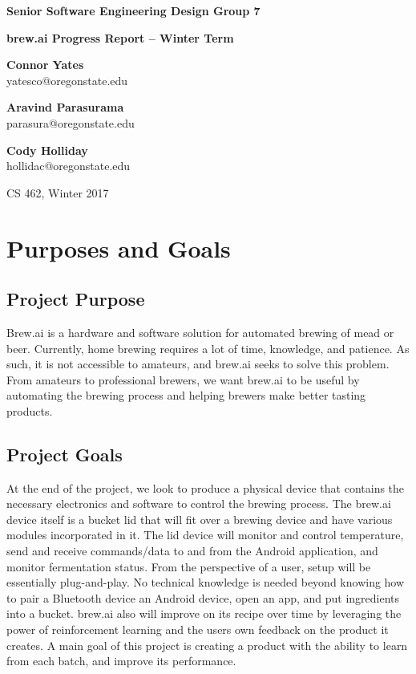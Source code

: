\documentclass[draftclsnofoot,onecolumn,letterpaper,10pt]{IEEEtran}
\begin{document}
\begin{center}
	{\huge\textbf{Senior Software Engineering Design Group 7}}
	\vspace{1cm}

	{\Huge\textbf{brew.ai Progress Report -- Winter Term}}

	\vspace{2cm}
	\textbf{Connor Yates}\\yatesco@oregonstate.edu

	\textbf{Aravind Parasurama}\\parasura@oregonstate.edu

	\textbf{Cody Holliday}\\hollidac@oregonstate.edu

	\vspace{2cm}
	{\Large CS 462, Winter 2017}
	\vspace{1cm}
\end{center}

\begin{abstract}

\end{abstract}

\newpage
\tableofcontents
\newpage

\section{Purposes and Goals}
\subsection{Project Purpose}
Brew.ai is a hardware and software solution for automated brewing of mead or beer.
Currently, home brewing requires a lot of time, knowledge, and patience.
As such, it is not accessible to amateurs, and brew.ai seeks to solve this problem.
From amateurs to professional brewers, we want brew.ai to be useful by automating the brewing process and helping brewers make better tasting products.

\subsection{Project Goals}
At the end of the project, we look to produce a physical device that contains the necessary electronics and software to control the brewing process.
The brew.ai device itself is a bucket lid that will fit over a brewing device and have various modules incorporated in it.
The lid device will monitor and control temperature, send and receive commands/data to and from the Android application, and monitor fermentation status.
From the perspective of a user, setup will be essentially plug-and-play.
No technical knowledge is needed beyond knowing how to pair a Bluetooth device an Android device, open an app, and put ingredients into a bucket.
brew.ai also will improve on its recipe over time by leveraging the power of reinforcement learning and the users own feedback on the product it creates.
A main goal of this project is creating a product with the ability to learn from each batch, and improve its performance.
\end{document}
